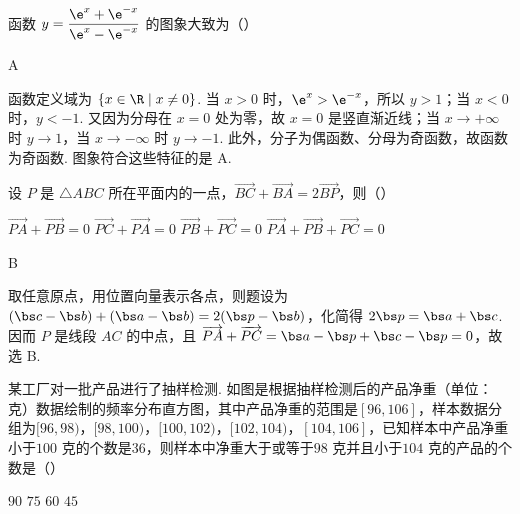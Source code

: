 \begin{problem}
函数 \( y = \dfrac{\e^x + \e^{-x}}{\e^x - \e^{-x}} \) 的图象大致为（\quad）

    {}
    {}
    {}
\end{problem}

\begin{answer}
A
\end{answer}

\begin{solution}
函数定义域为 \(\{x\in\R\mid x\ne0\}\). 当 \(x>0\) 时，\(\e^x>\e^{-x}\)，所以 \(y>1\)；当 \(x<0\) 时，\(y<-1\). 又因为分母在 \(x=0\) 处为零，故 \(x=0\) 是竖直渐近线；当 \(x\to+\infty\) 时 \(y\to1\)，当 \(x\to-\infty\) 时 \(y\to-1\). 此外，分子为偶函数、分母为奇函数，故函数为奇函数. 图象符合这些特征的是 A.
\end{solution}

\begin{problem}
设 \(P\) 是 \(\triangle ABC\) 所在平面内的一点，\(\overrightarrow{BC} + \overrightarrow{BA} = 2\overrightarrow{BP}\)，则（\quad）

\choices
    {\(\overrightarrow{PA} +\overrightarrow{PB} = 0\)}
    {\(\overrightarrow{PC} +\overrightarrow{PA} = 0\)}
    {\(\overrightarrow{PB} +\overrightarrow{PC} = 0\)}
    {\(\overrightarrow{PA} +\overrightarrow{PB} +\overrightarrow{PC} = 0\)}
\end{problem}

\begin{answer}
B
\end{answer}

\begin{solution}
取任意原点，用位置向量表示各点，则题设为 \((\bs c-\bs b)+(\bs a-\bs b)=2(\bs p-\bs b)\)，化简得 \(2\bs p=\bs a+\bs c\). 因而 \(P\) 是线段 \(AC\) 的中点，且 \(\overrightarrow{PA}+\overrightarrow{PC}=\bs a-\bs p+\bs c-\bs p=0\)，故选 B.
\end{solution}

\begin{problem}
某工厂对一批产品进行了抽样检测. 如图是根据抽样检测后的产品净重（单位：克）数据绘制的频率分布直方图，其中产品净重的范围是\([96,106]\)，样本数据分组为\([96,98)\)，\([98,100)\)，\([100,102)\)，\([102,104)\)，\([104,106]\)，已知样本中产品净重小于\(100\text{ 克}\)的个数是\(36\)，则样本中净重大于或等于\(98\text{ 克}\)并且小于\(104\text{ 克}\)的产品的个数是（\quad）


\choices
    {\(90\)}
    {\(75\)}
    {\(60\)}
    {\(45\)}
\end{problem}

